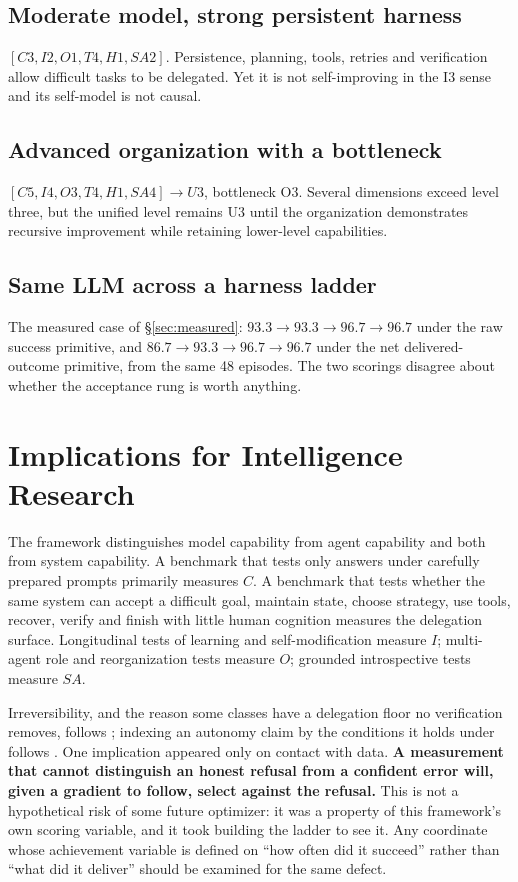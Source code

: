 \documentclass[11pt]{article}
\theoremstyle{definition}
\begin{document}
\subsection{Moderate model, strong persistent harness}
$[C3, I2, O1, T4, H1, SA2]$. Persistence, planning, tools, retries and verification allow difficult tasks to be delegated. Yet it is not self-improving in the I3 sense and its self-model is not causal.

\subsection{Advanced organization with a bottleneck}
$[C5, I4, O3, T4, H1, SA4] \to U3$, bottleneck O3. Several dimensions exceed level three, but the unified level remains U3 until the organization demonstrates recursive improvement while retaining lower-level capabilities.

\subsection{Same LLM across a harness ladder}
The measured case of \S\ref{sec:measured}: $93.3 \to 93.3 \to 96.7 \to 96.7$ under the raw success primitive, and $86.7 \to 93.3 \to 96.7 \to 96.7$ under the net delivered-outcome primitive, from the same 48 episodes. The two scorings disagree about whether the acceptance rung is worth anything.

\section{Implications for Intelligence Research}

The framework distinguishes model capability from agent capability and both from system capability. A benchmark that tests only answers under carefully prepared prompts primarily measures $C$. A benchmark that tests whether the same system can accept a difficult goal, maintain state, choose strategy, use tools, recover, verify and finish with little human cognition measures the delegation surface. Longitudinal tests of learning and self-modification measure $I$; multi-agent role and reorganization tests measure $O$; grounded introspective tests measure $SA$.

Irreversibility, and the reason some classes have a delegation floor no verification removes, follows \citet{perrow1984}; indexing an autonomy claim by the conditions it holds under follows \citet{sae2021j3016}. One implication appeared only on contact with data. \textbf{A measurement that cannot distinguish an honest refusal from a confident error will, given a gradient to follow, select against the refusal.} This is not a hypothetical risk of some future optimizer: it was a property of this framework's own scoring variable, and it took building the ladder to see it. Any coordinate whose achievement variable is defined on ``how often did it succeed'' rather than ``what did it deliver'' should be examined for the same defect.
\end{document}
